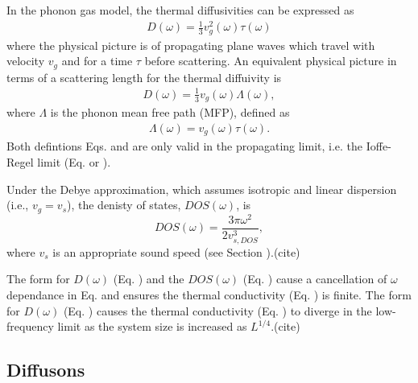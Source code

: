 \documentclass[aps,prb,twocolumn,superscriptaddress,footinbib,amsmath,amssymb,floatfix]{revtex4}
\begin{document}
In the phonon gas model, the thermal diffusivities can be expressed as
\begin{equation}\label{EQ:Dtau}
\begin{split}
D(\omega) = \frac{1}{3}v^2_g(\omega)\tau(\omega)
\end{split}
\end{equation}
where the physical picture is of propagating plane waves which 
travel with velocity $v_g$ and for a time $\tau$ before scattering. 
An equivalent physical picture in terms of a scattering length 
for the thermal diffuivity is
\begin{equation}\label{EQ:DLambda}
\begin{split}
D(\omega) = \frac{1}{3}v_g(\omega) \Lambda(\omega),
\end{split}
\end{equation}
where $\Lambda$ is the phonon mean free path (MFP), defined as 
\begin{equation}\label{EQ:Lambda}
\begin{split}
\Lambda(\omega) = v_{g}(\omega) \tau(\omega).
\end{split}
\end{equation}
Both defintions Eqs. and are only valid in the propagating 
limit, i.e. the Ioffe-Regel limit (Eq. or ). 

Under the Debye approximation, 
which assumes isotropic and linear dispersion (i.e., $v_g = v_s$), 
the denisty of states, $DOS(\omega)$, is
\begin{equation}\label{EQ:DOS_debye}
DOS(\omega) = \frac{3\pi\omega^2}{2v_{s,DOS}^3},
\end{equation}
where $v_s$ is an appropriate sound speed (see Section ).(cite)

The form for $D(\omega)$ (Eq. ) and the $DOS(\omega)$ (Eq. ) 
cause a cancellation of $\omega$ dependance in Eq. and ensures the 
thermal conductivity (Eq. ) is finite. The form for $D(\omega)$ 
(Eq. ) causes the thermal conductivity (Eq. ) to diverge 
in the low-frequency limit as the system size is increased as 
$L^{1/4}$.(cite)  

\subsection{\label{S:Theory:Thermal:Diffusons}Diffusons}
\end{document}

